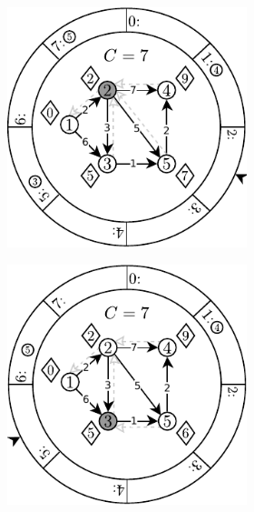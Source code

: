 \begin{figure}[!htbp]
\begin{subfigure}[b]{\textwidth}
\begin{subfigure}[b]{0.3\textwidth}
			\caption{}
			\label{fig:exampleDial:b}
		\end{subfigure}
		\hfill
		\begin{subfigure}[b]{0.3\textwidth}
			\includegraphics[width=\textwidth]{Chapter_II/DIAL-Example/c.pdf}
			\caption{}
			\label{fig:exampleDial:c}
		\end{subfigure}
	\hfill\null
	\end{subfigure}
	\begin{subfigure}[b]{\textwidth}
		\null\hfill
		\begin{subfigure}[b]{0.3\textwidth}
			\includegraphics[width=\textwidth]{Chapter_II/DIAL-Example/d.pdf}

\end{subfigure}
\end{subfigure}
\end{figure}
